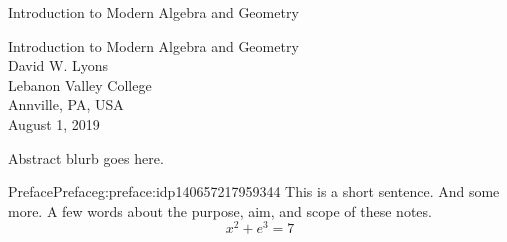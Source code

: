 \documentclass[oneside,10pt,]{book}
\numberwithin{equation}{section}
\begin{document}
\frontmatter
\thispagestyle{empty}
{\centering
\vspace*{0.28\textheight}
{\Huge Introduction to Modern Algebra and Geometry}\\}
\clearpage
\thispagestyle{empty}
\null%
\clearpage
\thispagestyle{empty}
{\centering
\vspace*{0.14\textheight}
{\Huge Introduction to Modern Algebra and Geometry}\\[3\baselineskip]
{\Large David W. Lyons}\\[0.5\baselineskip]
{\Large Lebanon Valley College\\
Annville, PA, USA}\\[3\baselineskip]
{\Large August 1, 2019}\\}
\clearpage
\thispagestyle{empty}
\null\clearpage
Abstract blurb goes here.%
%
%
\typeout{************************************************}
\typeout{************************************************}
%
\begin{preface}{Preface}{}{Preface}{}{}{g:preface:idp140657217959344}
This is a short sentence. And some more. A few words about the purpose, aim, and scope of these notes.%
%
\begin{equation*}
x^2 + e^3 = 7
\end{equation*}
\end{preface}
\setcounter{tocdepth}{1}
\renewcommand*\contentsname{Contents}
\tableofcontents
\mainmatter
%
%
\typeout{************************************************}
\typeout{************************************************}
%
\end{document}
